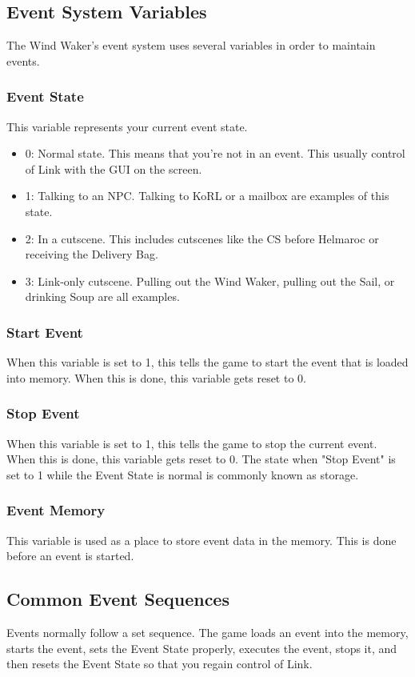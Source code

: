 \documentclass[titlepage,12pt,a4paper]{article}
\begin{document}
\subsection{Event System Variables}
The Wind Waker's event system uses several variables in order to maintain events.
	
\subsubsection{Event State}
This variable represents your current event state.
\begin{itemize}
	\item 0: Normal state. This means that you're not in an event. This usually control of Link with the GUI on the screen.
	\item 1: Talking to an NPC. Talking to KoRL or a mailbox are examples of this state.
	\item 2: In a cutscene. This includes cutscenes like the CS before Helmaroc or receiving the Delivery Bag.
	\item 3: Link-only cutscene. Pulling out the Wind Waker, pulling out the Sail, or drinking Soup are all examples.
\end{itemize}

\subsubsection{Start Event}
When this variable is set to 1, this tells the game to start the event that is loaded into memory. When this is done, this variable gets reset to 0.

\subsubsection{Stop Event}
When this variable is set to 1, this tells the game to stop the current event. When this is done, this variable gets reset to 0. The state when "Stop Event" is set to 1 while the Event State is normal is commonly known as storage.

\subsubsection{Event Memory}
This variable is used as a place to store event data in the memory. This is done before an event is started.

\subsection{Common Event Sequences}
Events normally follow a set sequence. The game loads an event into the memory, starts the event, sets the Event State properly, executes the event, stops it, and then resets the Event State so that you regain control of Link.
\end{document}
